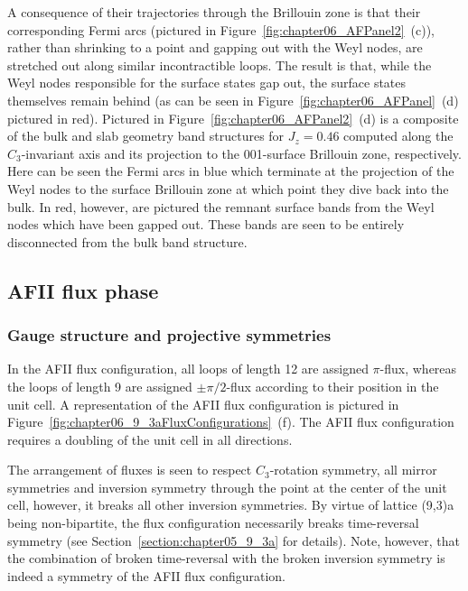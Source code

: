 A consequence of their trajectories through the Brillouin zone is that their corresponding Fermi arcs (pictured in Figure~\ref{fig:chapter06_AFPanel2}~(c)), rather than shrinking to a point and gapping out with the Weyl nodes, are stretched out along similar incontractible loops.
The result is that, while the Weyl nodes responsible for the surface states gap out, the surface states themselves remain behind (as can be seen in Figure~\ref{fig:chapter06_AFPanel}~(d) pictured in red).
Pictured in Figure~\ref{fig:chapter06_AFPanel2}~(d) is a composite of the bulk and slab geometry band structures for $J_z = 0.46$ computed along the $C_3$-invariant axis and its projection to the 001-surface Brillouin zone, respectively.
Here can be seen the Fermi arcs in blue which terminate at the projection of the Weyl nodes to the surface Brillouin zone at which point they dive back into the bulk.
In red, however, are pictured the remnant surface bands from the Weyl nodes which have been gapped out.
These bands are seen to be entirely disconnected from the bulk band structure.


%
%
\subsection{AFII flux phase}
\label{section:chapter06_AFIIPhase}
%
%
\subsubsection{Gauge structure and projective symmetries}
%
%
In the AFII flux configuration, all loops of length 12 are assigned $\pi$-flux, whereas the loops of length 9 are assigned $\pm \pi/2$-flux according to their position in the unit cell.
A representation of the AFII flux configuration is pictured in Figure~\ref{fig:chapter06_9_3aFluxConfigurations}~(f).
The AFII flux configuration requires a doubling of the unit cell in all directions.

The arrangement of fluxes is seen to respect $C_3$-rotation symmetry, all mirror symmetries and inversion symmetry through the point at the center of the unit cell, however, it breaks all other inversion symmetries.
By virtue of lattice (9,3)a being non-bipartite, the flux configuration necessarily breaks time-reversal symmetry (see Section~\ref{section:chapter05_9_3a} for details).
Note, however, that the combination of broken time-reversal with the broken inversion symmetry is indeed a symmetry of the AFII flux configuration.

